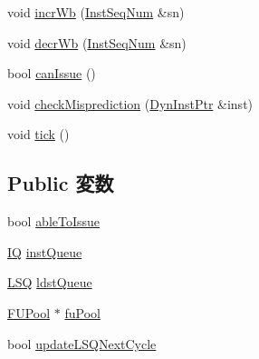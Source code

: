 \begin{DoxyCompactItemize}
\item 
void \hyperlink{classDefaultIEW_a203d5348c070560c49290bcaf1c4496a}{incrWb} (\hyperlink{inst__seq_8hh_a258d93d98edaedee089435c19ea2ea2e}{InstSeqNum} \&sn)
\item 
void \hyperlink{classDefaultIEW_a108570745f0a3cc383744de3180741fe}{decrWb} (\hyperlink{inst__seq_8hh_a258d93d98edaedee089435c19ea2ea2e}{InstSeqNum} \&sn)
\item 
bool \hyperlink{classDefaultIEW_a93204549d4730243f4d1b4873ff0ffef}{canIssue} ()
\item 
void \hyperlink{classDefaultIEW_aa2a3a423cd0b79a85083da555c98f0f3}{checkMisprediction} (\hyperlink{classDefaultIEW_a028ce10889c5f6450239d9e9a7347976}{DynInstPtr} \&inst)
\item 
void \hyperlink{classDefaultIEW_a873dd91783f9efb4a590aded1f70d6b0}{tick} ()
\end{DoxyCompactItemize}
\subsection*{Public 変数}
\begin{DoxyCompactItemize}
\item 
bool \hyperlink{classDefaultIEW_a7afe8710ac68efe63b0ae9fcca43853e}{ableToIssue}
\item 
\hyperlink{classDefaultIEW_aaecfbaa9bf5c22b455806f40f49ef627}{IQ} \hyperlink{classDefaultIEW_a190caab0d0faf2269b72f46da4bac40f}{instQueue}
\item 
\hyperlink{classLSQ}{LSQ} \hyperlink{classDefaultIEW_a9f2a7c471091519f7d05832eb48c2a9d}{ldstQueue}
\item 
\hyperlink{classFUPool}{FUPool} $\ast$ \hyperlink{classDefaultIEW_a480782fc1cfd21fd9748b26f2a08b97a}{fuPool}
\item 
bool \hyperlink{classDefaultIEW_a5cbd0281152001f7337f5d95155db5c0}{updateLSQNextCycle}
\end{DoxyCompactItemize}
